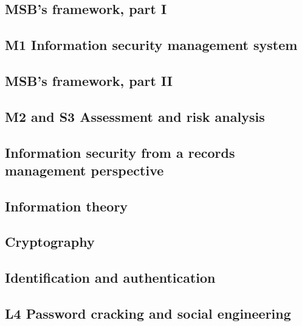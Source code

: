 %
%
\subsection{MSB's framework, part I}


\subsection{M1 Information security management system}


\subsection{MSB's framework, part II}


\subsection{M2 and S3 Assessment and risk analysis}


\subsection{Information security from a records management perspective}


\subsection{Information theory}


\subsection{Cryptography}


\subsection{Identification and authentication}


\subsection{L4 Password cracking and social engineering}


